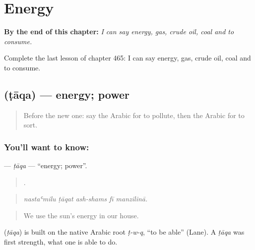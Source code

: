 
\chapter{Energy}
\label{ch:ar-energy}

\begin{chapteropening}
\textbf{By the end of this chapter:} \emph{I can say energy, gas, crude oil, coal and to consume.}

Complete the last lesson of chapter 465: I can say energy, gas, crude oil, coal and to consume.
\end{chapteropening}

\section[\texorpdfstring{\ar{طاقة} (ṭāqa)}{طاقة (ṭāqa)}]{ (ṭāqa) — energy; power}

\label{lesson:AR-C465-taqa}



\begin{quote}
Before the new one: say the Arabic for to pollute, then the Arabic for to sort.
\end{quote}

\subsection*{You'll want to know: }
\textbf{} — \emph{ṭāqa} — \textquotedblleft{}energy; power\textquotedblright{}.

\begin{quote}
    .
\end{quote}

\begin{quote}
\emph{nastaʿmilu ṭāqat ash-shams fī manzilinā.}
\end{quote}

\begin{quote}
We use the sun's energy in our house.
\end{quote}

\begin{cousinweb}
\textbf{} (\emph{ṭāqa}) is built on the native Arabic root \emph{ṭ-w-q}, \textquotedblleft{}to be able\textquotedblright{} (Lane). A \emph{ṭāqa} was first strength, what one is able to do.
\end{cousinweb}

